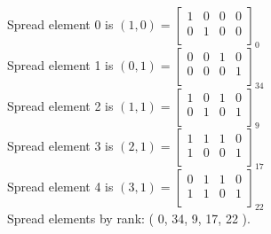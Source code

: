 \noindent
Spread element 0 is $( 1, 0 )=\left[
\begin{array}{*{4}{c}}
1 & 0 & 0 & 0 \\
0 & 1 & 0 & 0 \\
\end{array}
\right]_{0}
$\\
Spread element 1 is $( 0, 1 )=\left[
\begin{array}{*{4}{c}}
0 & 0 & 1 & 0 \\
0 & 0 & 0 & 1 \\
\end{array}
\right]_{34}
$\\
Spread element 2 is $( 1, 1 )=\left[
\begin{array}{*{4}{c}}
1 & 0 & 1 & 0 \\
0 & 1 & 0 & 1 \\
\end{array}
\right]_{9}
$\\
Spread element 3 is $( 2, 1 )=\left[
\begin{array}{*{4}{c}}
1 & 1 & 1 & 0 \\
1 & 0 & 0 & 1 \\
\end{array}
\right]_{17}
$\\
Spread element 4 is $( 3, 1 )=\left[
\begin{array}{*{4}{c}}
0 & 1 & 1 & 0 \\
1 & 1 & 0 & 1 \\
\end{array}
\right]_{22}
$\\
Spread elements by rank: ( 0, 34, 9, 17, 22 ).\\
